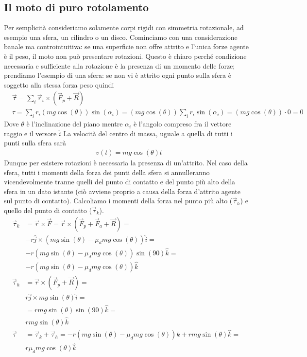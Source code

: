 \subsection{Il moto di puro rotolamento}
Per semplicità consideriamo solamente corpi rigidi con simmetria rotazionale, ad esempio una sfera, un cilindro o un disco. Cominciamo con una considerazione banale ma controintuitiva: se una superficie non offre attrito e l'unica forze agente è il peso, il moto non può presentare rotazioni. Questo è chiaro perché condizione necessaria e sufficiente alla rotazione è la presenza di un momento delle forze; prendiamo l'esempio di una sfera: se non vi è attrito ogni punto sulla sfera è soggetto alla stessa forza peso quindi
\begin{align*}
	&\vec{\tau} = \sum_i \vec{r}_i \times (\vec{F}_p + \vec{R})\\
	&\tau = \sum_i r_i (mg \cos(\theta))\sin(\alpha_i) = (mg \cos(\theta)) \sum_i r_i\sin(\alpha_i)= (mg \cos(\theta))\cdot 0 = 0
\end{align*} 
Dove $\theta$ è l'inclinazione del piano mentre $\alpha_i$ è l'angolo compreso fra il vettore raggio e il versore $\hat{i}$
La velocità del centro di massa, uguale a quella di tutti i punti sulla sfera sarà
\begin{align*}
	&v(t) = mg \cos(\theta ) t
\end{align*}
Dunque per esistere rotazioni è necessaria la presenza di un'attrito. Nel caso della sfera, tutti i momenti della forza dei punti della sfera si annulleranno vicendevolmente tranne quelli del punto di contatto e del punto più alto della sfera in un dato istante (ciò avviene proprio a causa della forza d'attrito agente sul punto di contatto). Calcoliamo i momenti della forza nel punto più alto ($\vec{\tau}_h$) e quello del punto di contatto ($\vec{\tau}_k$).
\begin{align*}
	\vec{\tau}_k &= \vec{r} \times \vec{F} = \vec{r} \times (\vec{F}_{p} + \vec{F}_{a} + \vec{R}) =\\
	& -r\hat{j} \times (mg \sin(\theta) - \mu_d mg \cos(\theta))\hat{i} =\\
	& -r (mg \sin(\theta) - \mu_d mg \cos(\theta)) \sin(90) \hat{k} =\\
	& -r (mg \sin(\theta) - \mu_d mg \cos(\theta)) \hat{k}\\
	\vec{\tau}_h &= \vec{r} \times (\vec{F}_{p} + \vec{R}) =\\
	& r\hat{j} \times mg \sin(\theta)\hat{i} =\\
	& = r mg \sin(\theta)\sin(90) \hat{k} =\\
	& r mg \sin(\theta) \hat{k}\\
	\vec{\tau} &= \vec{\tau}_k + \vec{\tau}_h = -r (mg \sin(\theta) - \mu_d mg \cos(\theta)) \hat{k} + r mg \sin(\theta) \hat{k} = \\
	& r\mu_d mg \cos(\theta) \hat{k}
\end{align*} 

